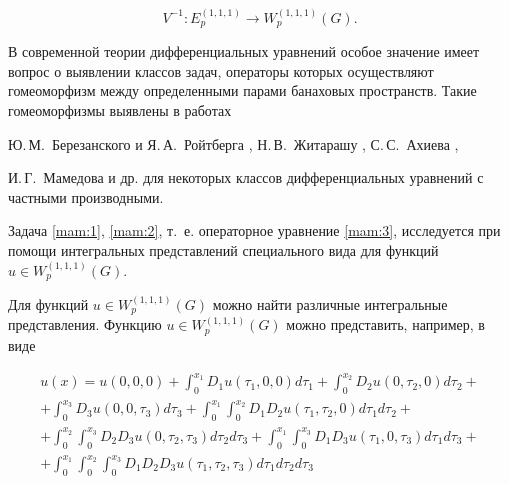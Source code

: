 $$

V^{-1}:E_{p}^{(1, 1, 1)}\rightarrow W_{p}^{(1, 1, 1)}(G).

$$



В современной теории дифференциальных уравнений особое значение имеет вопрос о выявлении классов задач, операторы которых осуществляют гомеоморфизм  между определенными парами банаховых пространств. Такие  гомеоморфизмы выявлены в работах 

Ю.\,М.~Березанского и Я.\,А.~Ройтберга \cite{mam:bib:15}, Н.\,В.~Житарашу \cite{mam:bib:16}, С.\,С.~Ахиева \cite{mam:bib:17}, 

И.\,Г.~Мамедова \cite{mam:bib:18} и др. для некоторых классов дифференциальных уравнений с частными производными.



Задача \eqref{mam:1}, \eqref{mam:2}, т.~е. операторное уравнение \eqref{mam:3}, исследуется при помощи интегральных представлений специального вида для функций   $u\in W_{p}^{( 1, 1, 1) } ( G)$. 

Для  функций $u\in W_{p}^{(1, 1, 1) } \left( G\right)$  можно найти различные интегральные представления. Функцию $u\in W_{p}^{\left( 1,1,1\right) } \left( G\right)$ можно представить, например, в виде

\begin{multline} \label{mam:4}

u(x) =u\left( 0,0,0\right) +\int_{0}^{x_1  }D_1 

u\left( \tau _1  ,0,0\right) d \tau _1  +\int_{0}^{x_2  }D_2 

u\left( 0,\tau _2  ,0\right) d \tau _2  +

\\

+\int_{0}^{x_3  }D_3  u\left( 0,0,\tau _3  \right) d \tau _3 

+\int_{0}^{x_1  }\int_{0}^{x_2  }D_1  D_2  u\left( \tau

_1  ,\tau _2  ,0\right) d\tau _1  d\tau _2  +

\\

+\int_{0}^{x_2 }\int_{0}^{x_3}D_2  D_3  u\left( 0,\tau _2  ,\tau _3  \right)

d\tau _2  d\tau _3 

+\int_{0}^{x_1  }\int_{0}^{x_3  } D_1  D_3  u\left( \tau

_1  , 0, \tau _3 \right) d\tau _1  d\tau _3 +

\\

+\int_{0}^{x_1  }\int_{0}^{x_2  }\int_{0}^{x_3 

}D_1  D_2  D_3  u\left( \tau _1 , \tau _2  ,\tau _3  \right) d\tau _1 

d\tau _2  d\tau _3  

\end{multline}

